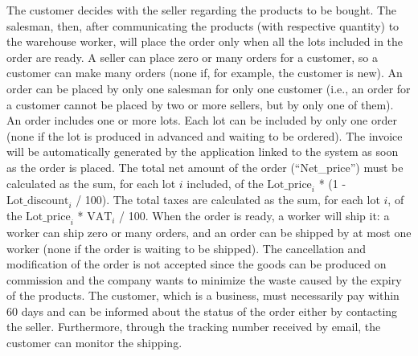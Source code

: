 The customer decides with the seller regarding the products to be bought. The salesman, then, after communicating the products (with respective quantity) to the warehouse worker, will place the order only when all the lots included in the order are ready. A seller can place zero or many orders for a customer, so a customer can make many orders (none if, for example, the customer is new). An order can be placed by only one salesman for only one customer (i.e., an order for a customer cannot be placed by two or more sellers, but by only one of them). An order includes one or more lots. Each lot can be included by only one order (none if the lot is produced in advanced and waiting to be ordered). The invoice will be automatically generated by the application linked to the system as soon as the order is placed. The total net amount of the order (``Net\_price'') must be calculated as the sum, for each lot $i$ included, of the $ \mathrm{Lot\_price}_i $ * (1 - $ \mathrm{Lot\_discount}_i $ / 100). The total taxes are calculated as the sum, for each lot $i$, of the $ \mathrm{Lot\_price}_i $ * $ \mathrm{VAT}_i $ / 100.
When the order is ready, a worker will ship it: a worker can ship zero or many orders, and an order can be shipped by at most one worker (none if the order is waiting to be shipped). The cancellation and modification of the order is not accepted since the goods can be produced on commission and the company wants to minimize the waste caused by the expiry of the products. The customer, which is a business, must necessarily pay within 60 days and can be informed about the status of the order either by contacting the seller. Furthermore, through the tracking number received by email, the customer can monitor the shipping.